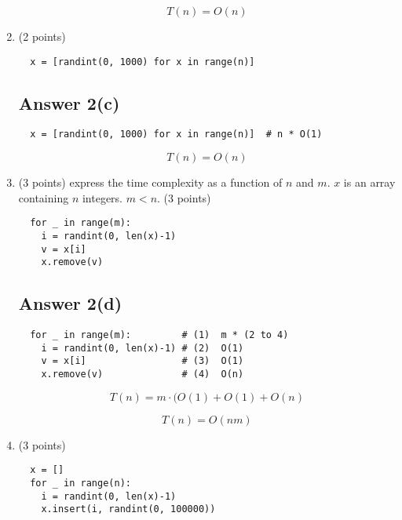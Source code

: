 \documentclass{article}
\begin{document}
\begin{enumerate}[label=(\alph*)]
\begin{equation*}
  \boxed{T(n) = O(n)}
\end{equation*}


\item (2 points)

\begin{verbatim}
  x = [randint(0, 1000) for x in range(n)]
\end{verbatim}

\subsection*{Answer 2(c)}

\begin{verbatim}
  x = [randint(0, 1000) for x in range(n)]  # n * O(1)
\end{verbatim}

\begin{equation}
  \boxed{T(n) = O(n)}
\end{equation}

\item (3 points) express the time complexity as a function of $n$ and $m$.
  $x$ is an array containing $n$ integers. $m < n$. (3 points)

\begin{verbatim}
  for _ in range(m):
    i = randint(0, len(x)-1)
    v = x[i]
    x.remove(v)
\end{verbatim}

\subsection*{Answer 2(d)}

\begin{verbatim}
  for _ in range(m):         # (1)  m * (2 to 4) 
    i = randint(0, len(x)-1) # (2)  O(1)
    v = x[i]                 # (3)  O(1)
    x.remove(v)              # (4)  O(n)
\end{verbatim}

\begin{equation*}
  T(n) = m \cdot ( O(1) + O(1) + O(n)
\end{equation*}

\begin{equation*}
  \boxed{T(n) = O(nm)}
\end{equation*}

\item (3 points)

\begin{verbatim}
  x = []
  for _ in range(n):
    i = randint(0, len(x)-1)
    x.insert(i, randint(0, 100000))
\end{verbatim}


\end{enumerate}
\end{document}
